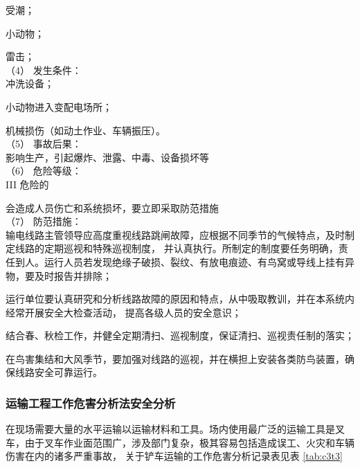  受潮；

 小动物；

 雷击；\\

（4） 发生条件：\\

 冲洗设备；

 小动物进入变配电场所；

 机械损伤（如动土作业、车辆振压）。\\


（5） 事故后果：\\

影响生产，引起爆炸、泄露、中毒、设备损坏等\\

（6） 危险等级：\\

III 危险的

会造成人员伤亡和系统损坏，要立即采取防范措施\\

（7） 防范措施：\\

 输电线路主管领导应高度重视线路跳闸故障，应根据不同季节的气候特点，及时制定线路的定期巡视和特殊巡视制度，
并认真执行。所制定的制度要任务明确，责任到人。运行人员若发现绝缘子破损、裂纹、有放电痕迹、有鸟窝或导线上挂有异物，要及时报告并排除； 

 运行单位要认真研究和分析线路故障的原因和特点，从中吸取教训，并在本系统内经常开展安全大检查活动，
提高各级人员的安全意识；

 结合春、秋检工作，并健全定期清扫、巡视制度，保证清扫、巡视责任制的落实；

 在鸟害集结和大风季节，要加强对线路的巡视，并在横担上安装各类防鸟装置，确保线路安全可靠运行。

\subsubsection{运输工程工作危害分析法安全分析}

在现场需要大量的水平运输以运输材料和工具。场内使用最广泛的运输工具是叉车，由于叉车作业面范围广，涉及部门复杂，极其容易包括造成误工、火灾和车辆伤害在内的诸多严重事故，
关于铲车运输的工作危害分析记录表见表 \ref{tab:c3t3}


